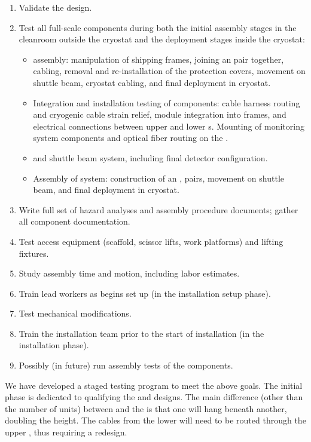 \begin{enumerate}
\item Validate the  design. 
\item Test all full-scale  components during both the initial assembly stages in the cleanroom outside the cryostat and the deployment stages inside the cryostat:  
\begin{itemize}
    \item {}  assembly: manipulation of  shipping frames, joining an  pair together,  cabling, removal and re-installation of the  protection covers, movement on shuttle beam, cryostat cabling, and final deployment in cryostat. 
    \item Integration and installation testing of  components: cable harness routing and cryogenic cable strain relief, module integration into  frames, and electrical connections between upper and lower s.   Mounting of  monitoring system components and optical fiber routing on the . %
    \item {} and shuttle beam system, including final detector configuration.
    \item Assembly of  system: construction of an , %
     pairs, movement on shuttle beam, and final deployment in cryostat.
\end{itemize}
\item Write full set of hazard analyses and assembly procedure documents; %
gather all component documentation. 
\item Test access equipment (scaffold, scissor lifts, work platforms) and lifting fixtures. 
\item Study assembly time and motion, including labor estimates. 
\item Train lead workers as  begins set up (in the installation setup phase).
\item Test mechanical modifications.
\item Train the installation team prior to the start of  installation (in the installation phase). 
\item Possibly (in future) run assembly tests of the  components.
\end{enumerate}

We have developed a staged testing program to meet the above goals.  The initial phase is dedicated to qualifying the  and  designs. The main difference (other than the number of units) between  and the   is that one  will hang beneath another, doubling the height. The cables from the lower  will need to be routed through the upper , thus requiring a redesign. 

